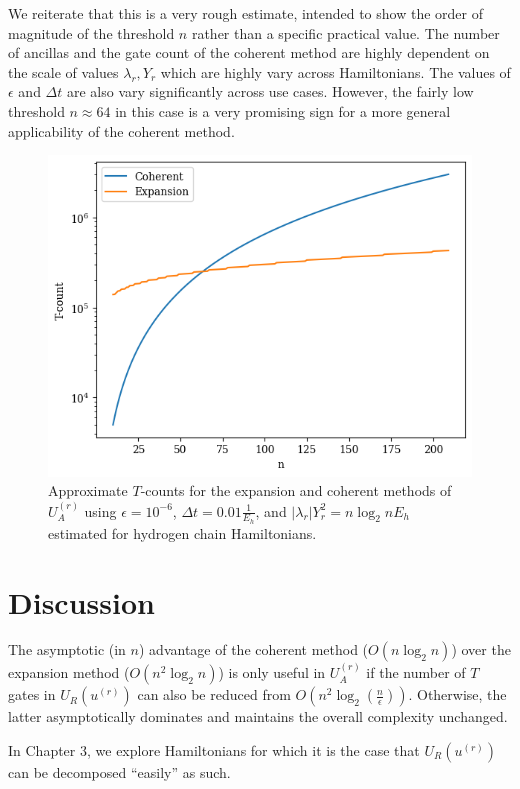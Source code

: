 We reiterate that this is a very rough estimate, intended to show the order of magnitude of the threshold $n$ rather than a specific practical value. The number of ancillas and the gate count of the coherent method are highly dependent on the scale of values $\lambda_r, Y_r$ which are highly vary across Hamiltonians. The values of $\epsilon$ and $\Delta t$ are also vary significantly across use cases. However, the fairly low threshold $n \approx 64$ in this case is a very promising sign for a more general applicability of the coherent method.


\begin{figure}[h]
    \centering
    \includegraphics{Tcount.png}
    \caption{Approximate $T$-counts for the expansion and coherent methods of $U_A^{(r)}$ using $\epsilon = 10^{-6}$, $\Delta t = 0.01 \frac{1}{E_h}$, and $|\lambda_r|Y_r^2 = n\log_2{n} E_h$ estimated for hydrogen chain Hamiltonians.}
    \label{fig: Tcounts}
\end{figure}



\section{Discussion}

The asymptotic (in $n$) advantage of the coherent method ($O(n\log_2{n})$) over the expansion method ($O(n^2\log_2{n})$) is only useful in $U_A^{(r)}$ if the number of $T$ gates in $U_R(u^{(r)})$ can also be reduced from $O(n^2\log_2(\frac{n}{\epsilon}))$. Otherwise, the latter asymptotically dominates and maintains the overall complexity unchanged.

In Chapter 3, we explore Hamiltonians for which it is the case that $U_R(u^{(r)})$ can be decomposed ``easily'' as such.



